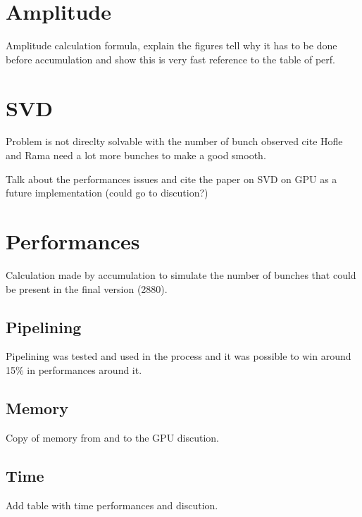 \section{Amplitude}

Amplitude calculation formula, explain the figures tell why it has to be done before accumulation and show this is very fast reference to the table of perf.

\section{SVD}

Problem is not direclty solvable with the number of bunch observed cite Hofle and Rama need a lot more bunches to make a good smooth\cite{calaga06}. 

Talk about the performances issues and cite the paper on SVD on GPU as a future implementation (could go to discution?)\cite{Lahabar09}

\section{Performances}

Calculation made by accumulation to simulate the number of bunches that could be present in the final version (2880).

   \subsection{Pipelining}

	Pipelining was tested and used in the process and it was possible to win around 15\% in performances around it.

   \subsection{Memory}

	Copy of memory from and to the GPU discution.

   \subsection{Time}

	Add table with time performances and discution.